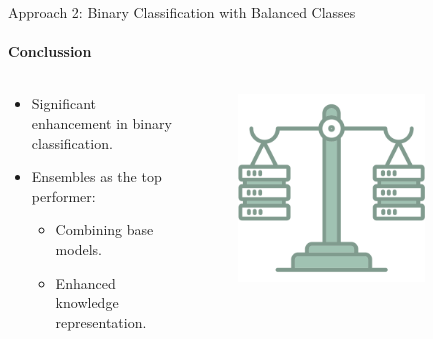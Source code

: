 \documentclass[9pt, pstricks, xcolor=dvipsnames]{beamer}
\begin{document}
\begin{frame}{Approach 2: Binary Classification
		with Balanced Classes}
	\framesubtitle{Conclussion}
	\begin{columns}
		\begin{column}{0.5\textwidth}
			\begin{itemize}
				\item Significant enhancement in binary classification.
				\item Ensembles as the top performer:
				      \begin{itemize}
					      \item Combining base models.
					      \item Enhanced knowledge representation.
				      \end{itemize}
			\end{itemize}
		\end{column}
		\begin{column}{0.5\textwidth}
			\begin{figure}
				\centering
				\includegraphics[width=0.8\textwidth]{images/load-balancer.png}
			\end{figure}
		\end{column}

	\end{columns}
\end{frame}
\end{document}
